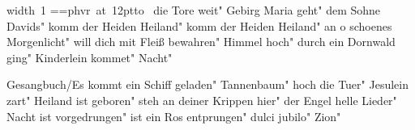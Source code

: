 \ifx\mxversion\undefined
  
  
  
  
\fi

%
\newbox\datebox%
\hbox{\pdfximage width 1\pdfrefximage\pdflastximage}
\setbox\datebox=\hbox{\font\datefont=phvr at 12pt\datefont{}\hbox to }%
\ht\datebox=0pt%
\box\datebox%
\vfill\eject
\tableofcontents
\normalmusicsize
 die Tore weit"
 Gebirg Maria geht"
 dem Sohne Davids"
 komm der Heiden Heiland"
 komm der Heiden Heiland"
 an o schoenes Morgenlicht"
 will dich mit Fleiß bewahren"
 Himmel hoch"
 durch ein Dornwald ging"
 Kinderlein kommet"
 Nacht"

 Gesangbuch/Es kommt ein Schiff geladen"
 Tannenbaum"
 hoch die Tuer"
 Jesulein zart"
 Heiland ist geboren"
 steh an deiner Krippen hier"
 der Engel helle Lieder"
 Nacht ist vorgedrungen"
 ist ein Ros entprungen"
\makeatletter
{}
\makeatother
 dulci jubilo"
\makeatletter
{}
\makeatother
 Zion"
\bookbye